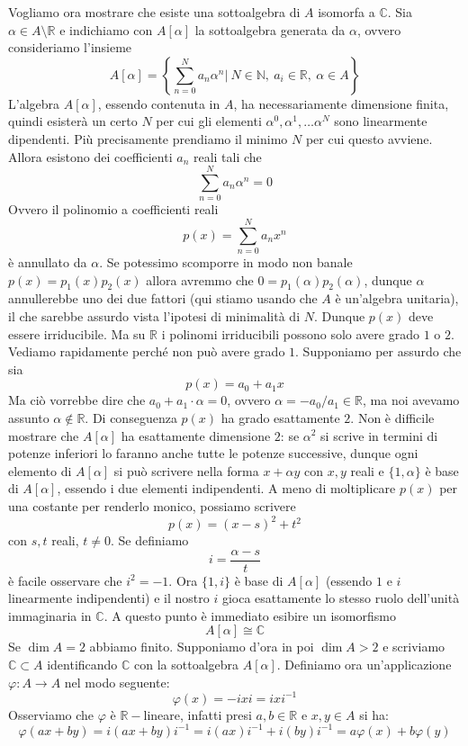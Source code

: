 \documentclass[11pt]{article}
\theoremstyle{plain}
\theoremstyle{definition}
\theoremstyle{remark}
\newcommand{\C}{\mathbb{C}}
\newcommand{\R}{\mathbb{R}}
\newcommand{\dsum}{\displaystyle\sum}
\begin{document}
Vogliamo ora mostrare che esiste una sottoalgebra di $A$ isomorfa a $\C$.
Sia $\alpha\in A \setminus\R$ e indichiamo con $A[\alpha]$ la sottoalgebra generata da $\alpha$, ovvero consideriamo l'insieme
\[A[\alpha] = \left\{ \dsum_{n = 0} ^N a_n \alpha^n |\ N\in\mathbb{N}, \ a_i \in \R,\ \alpha \in A   \right\} \]
L'algebra $A[\alpha]$, essendo contenuta in $A$, ha necessariamente dimensione finita, quindi esisterà un certo $N$ per cui gli elementi
$\alpha^0, \alpha^1, \dots \alpha^N$ sono linearmente dipendenti. Più precisamente prendiamo il minimo $N$ per cui questo avviene.
Allora esistono dei coefficienti $a_n$ reali tali che
\[ \dsum_{n=0}^N a_n \alpha^n = 0 \]
Ovvero il polinomio a coefficienti reali
\[ p(x) = \dsum_{n = 0}^N a_n x^n \] 
è annullato da $\alpha$.
Se potessimo scomporre in modo non banale $p(x) = p_1(x)p_2(x)$ allora avremmo che $0 = p_1(\alpha)p_2(\alpha)$, dunque $\alpha$ annullerebbe uno dei due fattori (qui
stiamo usando che $A$ è un'algebra unitaria), il che sarebbe assurdo vista l'ipotesi di minimalità di $N$.
Dunque $p(x)$ deve essere irriducibile. Ma su $\R$ i polinomi irriducibili possono solo avere grado $1$ o $2$.
Vediamo rapidamente perché non può avere grado $1$.
Supponiamo per assurdo che sia
\[p(x) = a_0 + a_1 x\]
Ma ciò vorrebbe dire che $a_0+a_1\cdot\alpha=0$, ovvero $\alpha=-a_0/a_1 \in \R$, ma noi avevamo assunto $\alpha\not\in\R$.
Di conseguenza $p(x)$ ha grado esattamente $2$.
Non è difficile mostrare che $A[\alpha]$ ha esattamente dimensione $2$: se $\alpha^2$ si scrive in termini di potenze inferiori lo faranno anche tutte le potenze successive,
dunque ogni elemento di $A[\alpha]$ si può scrivere nella forma $x + \alpha y$ con $x,y$ reali e $\{1,\alpha\}$ è base di $A[\alpha]$, essendo i due elementi indipendenti.
A meno di moltiplicare $p(x)$ per una costante per renderlo monico, possiamo scrivere 
\[ p(x) = (x-s)^2+t^2\]
con $s,t$ reali, $t\neq 0$. Se definiamo
\[i = \frac{\alpha-s}{t}\]
è facile osservare che $i^2 = -1$. Ora $\{1, i\}$ è base di $A[\alpha]$ (essendo $1$ e $i$ linearmente indipendenti) e il nostro $i$
gioca esattamente lo stesso ruolo dell'unità immaginaria in $\C$. A questo punto è immediato esibire un isomorfismo
\[ A[\alpha] \cong \C \]
Se $\dim A =2 $ abbiamo finito. Supponiamo d'ora in poi $\dim A > 2$ e scriviamo $\C\subset A$ identificando $\C$ con la
sottoalgebra $A[\alpha]$. Definiamo ora un'applicazione $\varphi:A\to A$ nel modo seguente:
\[ \varphi(x) = -ixi = ixi^{-1} \]
Osserviamo che $\varphi$ è $\R-$lineare, infatti presi $a,b\in\R$ e $x,y\in A$ si ha:
\[ \varphi(ax+by) = i(ax+by)i^{-1} = i(ax)i^{-1} +i(by)i^{-1} = a\varphi(x) + b\varphi(y)\]
\end{document}
